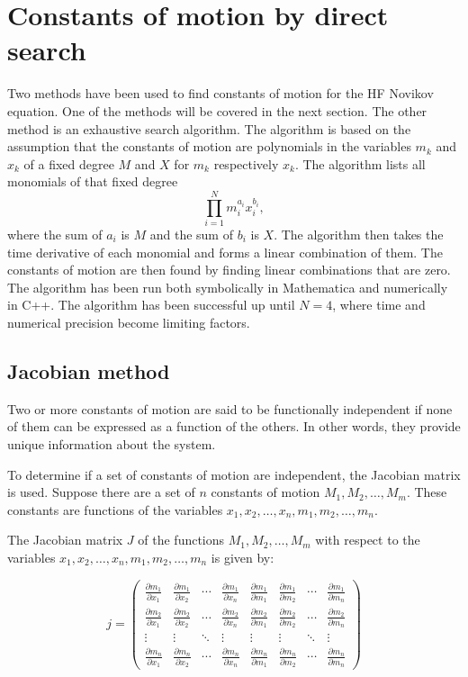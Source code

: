 \documentclass[english,master]{liumaiex}
\theoremstyle{plain}
\theoremstyle{definition}
\begin{document}
\section{Constants of motion by direct search}

Two methods have been used to find constants of motion for the HF Novikov equation. One of the methods will be covered in the next section. The other method is an exhaustive search algorithm. The algorithm is based on the assumption that the constants of motion are polynomials in the variables $m_k$ and $x_k$ of a fixed degree $M$ and $X$ for $m_k$ respectively $x_k$. The algorithm lists all monomials of that fixed degree
\begin{equation}
	\prod_{i=1}^{N} m_i^{a_i} x_i^{b_i},
\end{equation}
where the sum of $a_i$ is $M$ and the sum of $b_i$ is $X$. The algorithm then takes the time derivative of each monomial and forms a linear combination of them. The constants of motion are then found by finding linear combinations that are zero. The algorithm has been run both symbolically in Mathematica and numerically in C++. The algorithm has been successful up until $N = 4$, where time and numerical precision become limiting factors.

\subsection*{Jacobian method}
Two or more constants of motion are said to be functionally independent if none of them can be expressed as a function of the others. In other words, they provide unique information about the system.

To determine if a set of constants of motion are independent, the Jacobian matrix is used. Suppose there are a set of $n$ constants of motion $M_1,M_2,\dots,M_m$. These constants are functions of the variables $x_1,x_2,\dots,x_n,m_1,m_2,\dots,m_n$.

The Jacobian matrix $J$ of the functions ${M_1,M_2,\dots,M_m}$ with respect to the variables ${x_1,x_2,\dots,x_n,m_1,m_2,\dots,m_n}$ is given by:

\begin{equation}
	j = 
	\begin{pmatrix}
		\frac{\partial m_1}{\partial x_1} & \frac{\partial m_1}{\partial x_2} & \cdots & \frac{\partial m_1}{\partial x_n} & \frac{\partial m_1}{\partial m_1} & \frac{\partial m_1}{\partial m_2} & \cdots & \frac{\partial m_1}{\partial m_n} \\
		\frac{\partial m_2}{\partial x_1} & \frac{\partial m_2}{\partial x_2} & \cdots & \frac{\partial m_2}{\partial x_n} & \frac{\partial m_2}{\partial m_1} & \frac{\partial m_2}{\partial m_2} & \cdots & \frac{\partial m_2}{\partial m_n} \\
		\vdots & \vdots & \ddots & \vdots & \vdots & \vdots & \ddots & \vdots \\
		\frac{\partial m_n}{\partial x_1} & \frac{\partial m_n}{\partial x_2} & \cdots & \frac{\partial m_n}{\partial x_n} & \frac{\partial m_n}{\partial m_1} & \frac{\partial m_n}{\partial m_2} & \cdots & \frac{\partial m_n}{\partial m_n}
	\end{pmatrix}
\end{equation}
\end{document}

